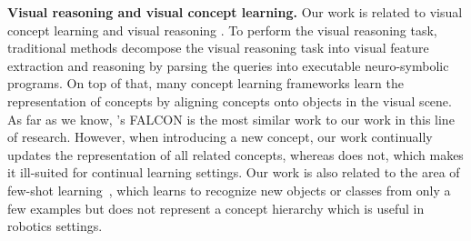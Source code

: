 \noindent\textbf{Visual reasoning and visual concept learning.} Our work is related to visual concept learning \citep{mei2022falcon, mao2018the, yi2019neuralsymbolic, han2020visual, li2020competenceaware} and visual reasoning \citep{Mascharka_2018, DBLP:journals/corr/abs-1807-08556, DBLP:journals/corr/JohnsonHMHLZG17, DBLP:journals/corr/abs-1803-03067}. To perform the visual reasoning task, traditional methods \citep{Mascharka_2018, DBLP:journals/corr/abs-1807-08556, DBLP:journals/corr/JohnsonHMHLZG17, DBLP:journals/corr/abs-1803-03067} decompose the visual reasoning task into visual feature extraction and reasoning by parsing the queries into executable neuro-symbolic programs.  On top of that, many concept learning frameworks \citep{mei2022falcon, mao2018the, yi2019neuralsymbolic, han2020visual, li2020competenceaware} learn the representation of concepts by aligning concepts onto objects in the visual scene. 
As far as we know, \citealt{mei2022falcon}'s FALCON is the most similar work to our work in this line of research. However, when introducing a new concept, our work continually updates the representation of all related concepts, whereas \citealt{mei2022falcon} does not, which makes it ill-suited for continual learning settings. Our work is also related to the area of few-shot learning~\citep{snell2017prototypical, tian2020rethinking, vinyals2017matching}, which learns to recognize new objects or classes from only a few examples but does not represent a concept hierarchy which is useful in robotics settings.




